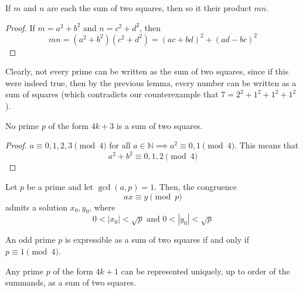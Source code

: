 \documentclass{article}
\newcounter{theorem}[section]
\newcounter{example}[section]
\begin{document}
\begin{lemma}
  \label{thm:sums-of-two-squares-are-closed-under}
If $m$ and $n$ are each the sum of two squares, then so it their product $mn$. 
\end{lemma}
\begin{proof}
If $m = a^2 + b^2$ and $n = c^2 + d^2$, then 
\begin{equation}
  mn = (a^2 + b^2)(c^2 + d^2) = (ac + bd)^2 + (ad - bc)^2
\end{equation}
\end{proof}

Clearly, not every prime can be written as the sum of two squares, since if this were indeed true, then by the previous lemma, every number can be written as a sum of squares (which contradicts our counterexample that $7 = 2^2 + 1^2 + 1^2 + 1^2$). 

\begin{theorem}
  \label{thm:primes-of-the-form-4k3-are-not-sums-of-two}
No prime $p$ of the form $4k + 3$ is a sum of two squares. 
\end{theorem}
\begin{proof}
$a \equiv 0, 1, 2, 3 \pmod{4}$ for all $a \in \mathbb{N} \implies a^2 \equiv 0, 1 \pmod{4}$. This means that 
\begin{equation}
  a^2 + b^2 \equiv 0, 1, 2 \pmod{4}
\end{equation}
\end{proof}

\begin{lemma}
  \label{thm:thues-lemma}
Let $p$ be a prime and let $\gcd(a, p) = 1$. Then, the congruence
\begin{equation}
  a x \equiv y \pmod{p}
\end{equation}
admits a solution $x_0, y_0$, where
\begin{equation}
  0 < |x_0| < \sqrt{p} \text{  and  } 0 < |y_0| < \sqrt{p}
\end{equation}
\end{lemma}

\begin{theorem}[Fermat]
  \label{thm:fermat-2}
An odd prime $p$ is expressible as a sum of two squares if and only if $p \equiv 1 \pmod{4}$. 
\end{theorem}

\begin{corollary}
  \label{thm:fermats-two-square-theorem}
Any prime $p$ of the form $4k+1$ can be represented uniquely, up to order of the summands, as a sum of two squares. 
\end{corollary}
\end{document}
